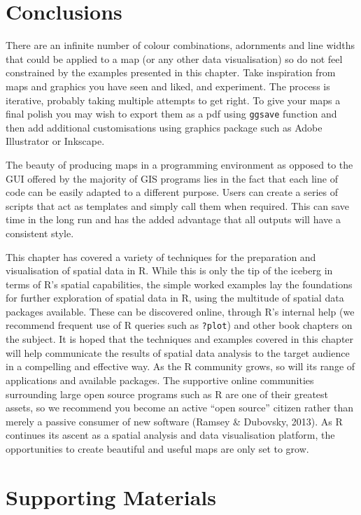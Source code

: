 \documentclass[]{article}
\begin{document}
\section{Conclusions}

There are an infinite number of colour combinations,
adornments and line widths that could be applied to a map (or any other
data visualisation) so do not feel constrained by the examples presented
in this chapter. Take inspiration from maps and graphics you have seen
and liked, and experiment. The process is iterative, probably taking
multiple attempts to get right. To give your
maps a final polish you may wish to export them as a pdf using
\texttt{ggsave} function and then add additional customisations using
graphics package such as Adobe Illustrator or Inkscape.

The beauty of producing maps in a programming environment as opposed to
the GUI offered by the majority of GIS programs lies in the fact that
each line of code can be easily adapted to a different purpose. Users
can create a series of scripts that act as templates and simply call
them when required. This can save time in the long run and has the added
advantage that all outputs will have a consistent style.

This chapter has covered a variety of techniques for the preparation and
visualisation of spatial data in R. While this is only the tip of the
iceberg in terms of R's spatial capabilities, the simple worked examples
lay the foundations for further exploration of spatial data in R, using
the multitude of spatial data packages available. These can be
discovered online, through R's internal help (we recommend frequent use
of R queries such as \texttt{?plot}) and other book chapters on the
subject. It is hoped that the techniques and examples covered in this
chapter will help communicate the results of spatial data analysis to
the target audience in a compelling and effective way. As the R community grows, so will its range of
applications and available packages. The supportive online communities
surrounding large open source programs such as R are one of their
greatest assets, so we recommend you become an active ``open source''
citizen rather than merely a passive consumer of new software (Ramsey \&
Dubovsky, 2013). As R continues its ascent as a spatial analysis and
data visualisation platform, the opportunities
to create beautiful and useful maps are only set to grow.

\section{Supporting Materials}
\end{document}
